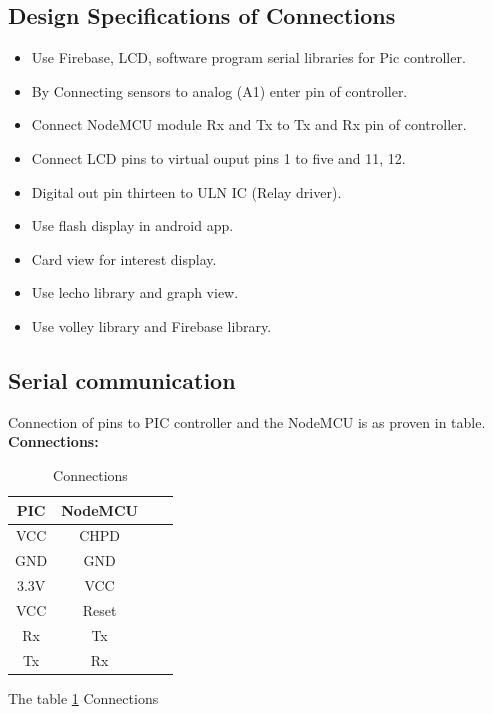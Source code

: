 \documentclass[12pt,a4paper]{article}
\begin{document}
\subsection{Design Specifications of Connections}

\begin{itemize}
	\item Use Firebase, LCD, software program serial libraries for Pic controller.
	\item By Connecting sensors to analog (A1)  enter pin of controller.
	\item Connect NodeMCU module Rx and Tx to Tx and Rx pin of controller.
	\item Connect LCD pins to virtual ouput pins 1 to five and 11, 12.
	\item Digital out pin  thirteen to ULN IC (Relay driver).
	\item Use flash display in android app.
	\item Card view for  interest display.
	\item Use lecho library and graph view. 
	\item Use volley library and Firebase library.
\end{itemize}

\subsection{Serial communication}
\hspace{0.5cm}Connection of pins to PIC controller and the NodeMCU is as proven in table.\\


\textbf{Connections:}\\

\begin{table}[h!]
  \begin{center}
    \begin{tabular}{|c|c|r|p{1.7cm}|}
     \hline
    PIC & NodeMCU\\
    \hline
    VCC & CHPD\\
    \hline
    GND & GND\\
    \hline
    3.3V & VCC\\
    \hline
    VCC & Reset\\
    \hline
    Rx & Tx\\
    \hline
    Tx & Rx\\
    \hline
  \end{tabular}
  \caption{Connections }
  \label{tab:table1}
 \end{center}
\end{table}
\begin{center}
The table \ref{tab:table1} Connections
\end{center}
\end{document}
